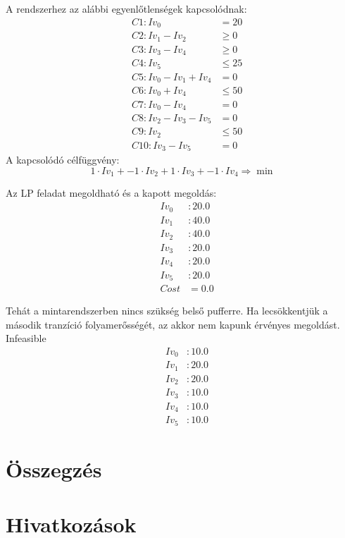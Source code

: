 \documentclass[12pt,a4paper]{book}
\begin{document}
A rendszerhez az alábbi egyenlőtlenségek kapcsolódnak:
\begin{align*}
&C1: Iv_0 &= 20 \\
&C2: Iv_1 - Iv_2 &\geq 0\\
&C3: Iv_3 - Iv_4 &\geq 0\\
&C4: Iv_5 &\leq 25\\
&C5: Iv_0 - Iv_1 + Iv_4 &= 0\\
&C6: Iv_0 + Iv_4 &\leq 50\\
&C7: Iv_0 - Iv_4 &= 0\\
&C8: Iv_2 - Iv_3 - Iv_5 &= 0\\
&C9: Iv_2 &\leq 50\\
&C10: Iv_3 - Iv_5 &= 0
\end{align*}
A kapcsolódó célfüggvény:
$$1\cdot Iv_1 + -1\cdot Iv_2 + 1\cdot Iv_3 + -1\cdot Iv_4\Rightarrow \min$$

Az LP feladat megoldható és a kapott megoldás:
\begin{align*}
&Iv_0 &: 20.0\\
&Iv_1 &: 40.0\\
&Iv_2 &: 40.0\\
&Iv_3 &: 20.0\\
&Iv_4 &: 20.0\\
&Iv_5 &: 20.0\\
&Cost &= 0.0
\end{align*}

Tehát a mintarendszerben nincs szükség belső pufferre. 
Ha lecsökkentjük a második tranzíció folyamerősségét, az akkor nem kapunk érvényes megoldást. \\
Infeasible
\begin{align*}
&Iv_0 &: 10.0\\
&Iv_1 &: 20.0\\
&Iv_2 &: 20.0\\
&Iv_3 &: 10.0\\
&Iv_4 &: 10.0\\
&Iv_5 &: 10.0
\end{align*}
\chapter{Összegzés}


\chapter{Hivatkozások}

\end{document}
